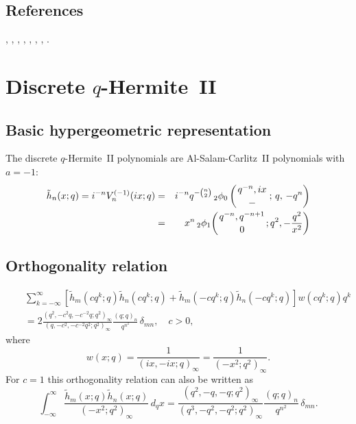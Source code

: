 \documentclass[envcountchap,graybox]{svmono}
\newcommand{\qhyp}[5]{\mbox{}_{#1}{\phi}_{#2}
\left(\genfrac{}{}{0pt}{}{#3}{#4}\,;\,q,\,#5\right)}
\newcommand{\qhypK}[5]{\,\mbox{}_{#1}\phi_{#2}\!\left(
  \genfrac{}{}{0pt}{}{#3}{#4};#5\right)}
\begin{document}
\subsection*{References}
\cite{AlSalam90}, \cite{AlSalamCarlitz}, \cite{AtakRahmanSuslov},
\cite{BergIsmail}, \cite{BustozIsmail82}, \cite{GasperRahman90}, \cite{Hahn},
\cite{Koorn97}.


\newpage

\section{Discrete $q$-Hermite~II}
\par\setcounter{equation}{0}

\subsection*{Basic hypergeometric representation}
The discrete $q$-Hermite~II polynomials are Al-Salam-Carlitz~II polynomials
with $a=-1$:
\begin{eqnarray}
\label{DefDiscreteqHermiteII}
{\tilde h}_n(x;q)=i^{-n}V_n^{(-1)}(ix;q)
&=&i^{-n}q^{-\binom{n}{2}}\,\qhyp{2}{0}{q^{-n},ix}{-}{-q^n}\\
&=&x^n
\qhypK{2}{1}{q^{-n},q^{-n+1}}{0}{q^2,-\frac{q^2}{x^2}}\nonumber
\end{eqnarray}

\subsection*{Orthogonality relation}
\begin{eqnarray}
\label{OrtDiscreteqHermiteIIa}
& &\sum_{k=-\infty}^{\infty}\left[{\tilde h}_m(cq^k;q)
{\tilde h}_n(cq^k;q)+{\tilde h}_m(-cq^k;q){\tilde h}_n(-cq^k;q)\right]
w(cq^k;q)q^k\nonumber\\
& &{}=2\frac{(q^2,-c^2q,-c^{-2}q;q^2)_{\infty}}{(q,-c^2,-c^{-2}q^2;q^2)_{\infty}}
\frac{(q;q)_n}{q^{n^2}}\,\delta_{mn},\quad c>0,
\end{eqnarray}
where
$$w(x;q)=\frac{1}{(ix,-ix;q)_{\infty}}=\frac{1}{(-x^2;q^2)_{\infty}}.$$
For $c=1$ this orthogonality relation can also be written as
\begin{equation}
\label{OrtDiscreteqHermiteIIb}
\int_{-\infty}^{\infty}\frac{{\tilde h}_m(x;q){\tilde h}_n(x;q)}{(-x^2;q^2)_{\infty}}\,d_qx
=\frac{\left(q^2,-q,-q;q^2\right)_{\infty}}{\left(q^3,-q^2,-q^2;q^2\right)_{\infty}}
\frac{(q;q)_n}{q^{n^2}}\,\delta_{mn}.
\end{equation}
\end{document}
